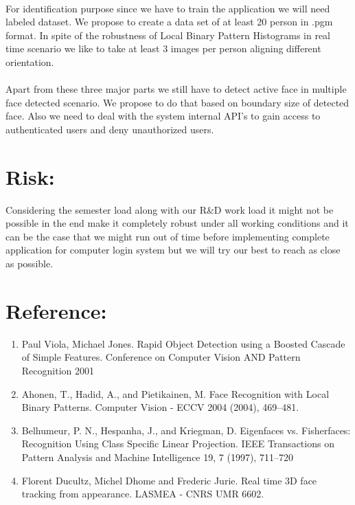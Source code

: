 \documentclass[11pt]{article}
\begin{document}
\paragraph{} For identification purpose since we have to train the application we will need labeled dataset. We propose to create a data set of at least 20 person in .pgm format. In spite of the robustness of Local Binary Pattern Histograms in real time scenario we like to take at least 3 images per person aligning different orientation.

\paragraph*{} Apart from these three major parts we still have to detect active face in multiple face detected scenario. We propose to do that based on boundary size of detected face. Also we need to deal with the system internal API's to gain access to authenticated users and deny unauthorized users.

\section*{Risk:} Considering the semester load along with our R\&D work load it might not be possible in the end make it completely robust under all working conditions and it can be the case that we might run out of time before implementing complete application for computer login system but we will try our best to reach as close as possible.
\section*{Reference:}
\begin{enumerate}
  \item Paul Viola, Michael Jones. Rapid Object Detection using a Boosted Cascade of Simple Features. Conference on Computer Vision AND Pattern Recognition 2001
\item Ahonen, T., Hadid, A., and Pietikainen, M. Face Recognition with Local Binary Patterns. Computer Vision - ECCV 2004 (2004), 469–481.

  \item Belhumeur, P. N., Hespanha, J., and Kriegman, D. Eigenfaces vs. Fisherfaces: Recognition Using Class Specific Linear Projection. IEEE Transactions on Pattern Analysis and Machine Intelligence 19, 7 (1997), 711–720
	
	\item Florent Ducultz, Michel Dhome and Frederic Jurie. Real time 3D face tracking from appearance. LASMEA - CNRS UMR 6602.
	

\end{enumerate}
\end{document}
